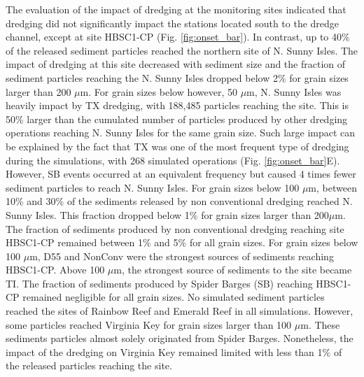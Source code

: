 \documentclass[preprint,12pt,authoryear]{elsarticle}
\begin{document}
The evaluation of the impact of dredging at the monitoring sites indicated that dredging did not significantly impact the stations located south to the dredge channel, except at site HBSC1-CP (Fig. \ref{fig:onset_bar}). In contrast, up to 40\% of the released sediment particles reached the northern site of N. Sunny Isles. The impact of dredging at this site decreased with sediment size and the fraction of sediment particles reaching the N. Sunny Isles dropped below 2\% for grain sizes larger than 200 $\mu$m. For grain sizes below however, 50 $\mu$m, N. Sunny Isles was heavily impact by TX dredging, with 188,485 particles reaching the site. This is 50\% larger than the cumulated number of particles produced by other dredging operations reaching N. Sunny Isles for the same grain size. Such large impact can be explained by the fact that TX was one of the most frequent type of dredging during the simulations, with 268 simulated operations (Fig. \ref{fig:onset_bar}E). However, SB events occurred at an equivalent frequency but caused 4 times fewer sediment particles to reach N. Sunny Isles. For grain sizes below 100 $\mu$m, between 10\% and 30\% of the sediments released by non conventional dredging reached N. Sunny Isles. This fraction dropped below  1\% for grain sizes larger than 200$\mu$m. The fraction of sediments produced by non conventional dredging reaching site HBSC1-CP remained between 1\% and 5\% for all grain sizes. For grain sizes below 100 $\mu$m, D55 and NonConv were the strongest sources of sediments reaching HBSC1-CP. Above 100 $\mu$m, the strongest source of sediments to the site became TI. The fraction of sediments produced by Spider Barges (SB) reaching HBSC1-CP remained negligible for all grain sizes. No simulated sediment particles reached the sites of Rainbow Reef and Emerald Reef in all simulations. However, some particles reached Virginia Key for grain sizes larger than 100 $\mu$m. These sediments particles almost solely originated from Spider Barges. Nonetheless, the impact of the dredging on Virginia Key remained limited with less than 1$\%$ of the released particles reaching the site.
\end{document}
